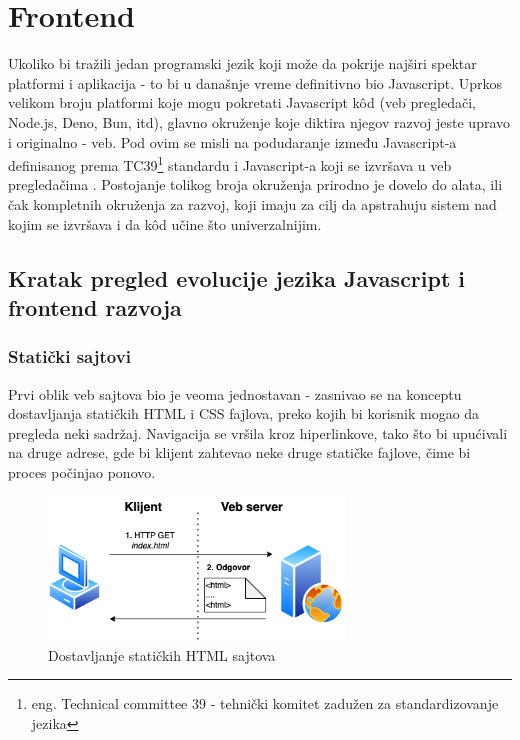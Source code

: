\documentclass[12pt,oneside]{memoir}
\begin{document}
    






\chapter{Frontend}

Ukoliko bi tražili jedan programski jezik koji može da pokrije najširi spektar platformi i aplikacija - to bi u današnje vreme definitivno bio Javascript. Uprkos velikom broju platformi koje mogu pokretati Javascript k\^{o}d (veb pregledači, Node.js, Deno, Bun, itd), glavno okruženje koje diktira njegov razvoj jeste upravo i originalno - veb. Pod ovim se misli na podudaranje između Javascript-a definisanog prema TC39\footnote{eng. Technical committee 39 - tehnički komitet zadužen za standardizovanje jezika} standardu i Javascript-a koji se izvršava u veb pregledačima \cite{ydkjs}. Postojanje tolikog broja okruženja prirodno je dovelo do alata, ili čak kompletnih okruženja za razvoj, koji imaju za cilj da apstrahuju sistem nad kojim se izvršava i da k\^{o}d učine što univerzalnijim.


\section{Kratak pregled evolucije jezika Javascript i frontend razvoja}

\subsection{Statički sajtovi}
Prvi oblik veb sajtova bio je veoma jednostavan - zasnivao se na konceptu dostavljanja statičkih HTML i CSS fajlova, preko kojih bi korisnik mogao da pregleda neki sadržaj. Navigacija se vršila kroz hiperlinkove, tako što bi upućivali na druge adrese, gde bi klijent zahtevao neke druge statičke fajlove, čime bi proces počinjao ponovo.

\begin{figure}[h]
  \centering
  \includegraphics[width=0.7\textwidth]{docs/images/ch_4/frontend-dev-phase0.png} 
  \caption{Dostavljanje statičkih HTML sajtova}
  \label{fig:sample}
\end{figure}
\end{document}
